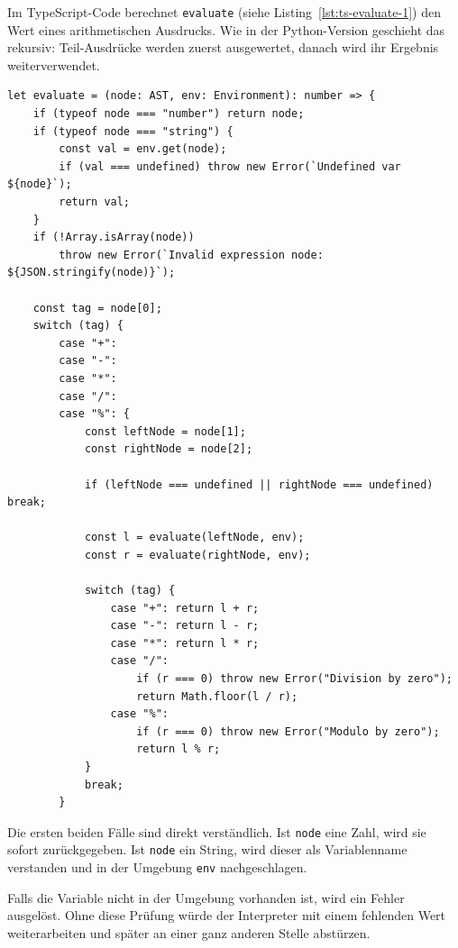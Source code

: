 Im TypeScript-Code berechnet \texttt{evaluate} (siehe Listing~\ref{lst:ts-evaluate-1}) den Wert eines arithmetischen Ausdrucks. Wie in der Python-Version geschieht das rekursiv: Teil-Ausdrücke werden zuerst ausgewertet, danach wird ihr Ergebnis weiterverwendet.

\begin{listing}[htbp]
\caption{Arithmetische Auswertung in TypeScript (Teil 1: Basisoperatoren)}
\label{lst:ts-evaluate-1}
\begin{verbatim}
let evaluate = (node: AST, env: Environment): number => {
    if (typeof node === "number") return node;
    if (typeof node === "string") {
        const val = env.get(node);
        if (val === undefined) throw new Error(`Undefined var ${node}`);
        return val;
    }
    if (!Array.isArray(node))
        throw new Error(`Invalid expression node: ${JSON.stringify(node)}`);

    const tag = node[0];
    switch (tag) {
        case "+":
        case "-":
        case "*":
        case "/":
        case "%": {
            const leftNode = node[1];
            const rightNode = node[2];
            
            if (leftNode === undefined || rightNode === undefined) break;
            
            const l = evaluate(leftNode, env);
            const r = evaluate(rightNode, env);
            
            switch (tag) {
                case "+": return l + r;
                case "-": return l - r;
                case "*": return l * r;
                case "/":
                    if (r === 0) throw new Error("Division by zero");
                    return Math.floor(l / r);
                case "%":
                    if (r === 0) throw new Error("Modulo by zero");
                    return l % r;
            }
            break;
        }
\end{verbatim}
\end{listing}

Die ersten beiden Fälle sind direkt verständlich. Ist \texttt{node} eine Zahl, wird sie sofort zurückgegeben. Ist \texttt{node} ein String, wird dieser als Variablenname verstanden und in der Umgebung \texttt{env} nachgeschlagen.

Falls die Variable nicht in der Umgebung vorhanden ist, wird ein Fehler ausgelöst. Ohne diese Prüfung würde der Interpreter mit einem fehlenden Wert weiterarbeiten und später an einer ganz anderen Stelle abstürzen.

